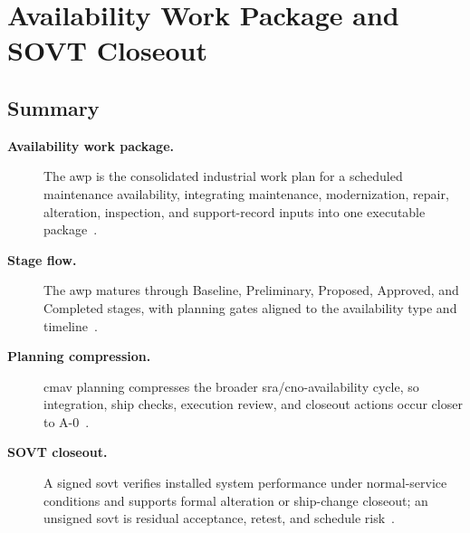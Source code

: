 \documentclass[../main.tex]{subfiles}
\begin{document}

\section{Availability Work Package and SOVT Closeout}

\subsection{Summary}
\begin{description}
  \item[\textbf{Availability work package.}] The \ac{awp} is the consolidated industrial work plan for a scheduled
        maintenance availability, integrating maintenance, modernization, repair, alteration, inspection, and
        support-record inputs into one executable package~\autocite{COMFLTFORCOMINST4790-3,edo-4-2-1-cno-availability-planning-2025}.
  \item[\textbf{Stage flow.}] The \ac{awp} matures through Baseline, Preliminary, Proposed, Approved, and Completed
        stages, with planning gates aligned to the availability type and timeline~\autocite{COMFLTFORCOMINST4790-3,edo-4-2-1-cno-availability-planning-2025,edo-4-2-2-cno-availability-execution-2025}.
  \item[\textbf{Planning compression.}] \ac{cmav} planning compresses the broader \ac{sra}/\ac{cno}-availability cycle,
        so integration, ship checks, execution review, and closeout actions occur closer to A-0~\autocite{COMFLTFORCOMINST4790-3,edo-4-2-1-cno-availability-planning-2025,edo-4-2-2-cno-availability-execution-2025}.
  \item[\textbf{SOVT closeout.}] A signed \ac{sovt} verifies installed system performance under normal-service
        conditions and supports formal alteration or ship-change closeout; an unsigned \ac{sovt} is residual
        acceptance, retest, and schedule risk~\autocite{TS9090-310}.
\end{description}
\end{document}
